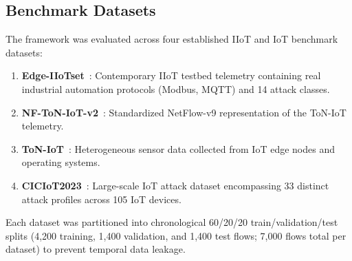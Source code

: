 \documentclass[10pt,journal,compsoc,twocolumn]{IEEEtran}
\begin{document}
\subsection{Benchmark Datasets}
The framework was evaluated across four established IIoT and IoT benchmark datasets:
\begin{enumerate}
    \item \textbf{Edge-IIoTset}~\cite{edge2024benchmarking}: Contemporary IIoT testbed telemetry containing real industrial automation protocols (Modbus, MQTT) and 14 attack classes.
    \item \textbf{NF-ToN-IoT-v2}~\cite{sarhan2021netflow}: Standardized NetFlow-v9 representation of the ToN-IoT telemetry.
    \item \textbf{ToN-IoT}~\cite{moustafa2020toniot}: Heterogeneous sensor data collected from IoT edge nodes and operating systems.
    \item \textbf{CICIoT2023}~\cite{ciciot2023dataset}: Large-scale IoT attack dataset encompassing 33 distinct attack profiles across 105 IoT devices.
\end{enumerate}
Each dataset was partitioned into chronological 60/20/20 train/validation/test splits (4,200 training, 1,400 validation, and 1,400 test flows; 7,000 flows total per dataset) to prevent temporal data leakage.
\end{document}
